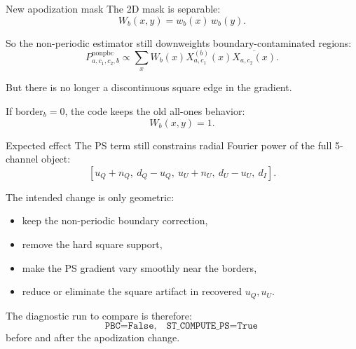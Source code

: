 \documentclass[aspectratio=169,11pt]{beamer}
\begin{document}
\begin{frame}[fragile]{New apodization mask}
The 2D mask is separable:
\[
  W_b(x,y)=w_b(x)\,w_b(y).
\]

\vspace{0.25em}
So the non-periodic estimator still downweights boundary-contaminated regions:
\[
  P^{\mathrm{nonpbc}}_{a,c_1,c_2,b}
  \propto
  \sum_x
  W_b(x)
  X^{(b)}_{a,c_1}(x)
  \overline{X_{a,c_2}(x)}.
\]

\vspace{0.25em}
But there is no longer a discontinuous square edge in the gradient.

\vspace{0.25em}
If $\mathrm{border}_b=0$, the code keeps the old all-ones behavior:
\[
  W_b(x,y)=1.
\]
\end{frame}

\begin{frame}[fragile]{Expected effect}
The PS term still constrains radial Fourier power of the full 5-channel object:
\[
  [u_Q+n_Q,\ d_Q-u_Q,\ u_U+n_U,\ d_U-u_U,\ d_I].
\]

\vspace{0.25em}
The intended change is only geometric:
\begin{itemize}
  \item keep the non-periodic boundary correction,
  \item remove the hard square support,
  \item make the PS gradient vary smoothly near the borders,
  \item reduce or eliminate the square artifact in recovered $u_Q,u_U$.
\end{itemize}

\vspace{0.25em}
The diagnostic run to compare is therefore:
\[
  \texttt{PBC=False},\quad \texttt{ST\_COMPUTE\_PS=True}
\]
before and after the apodization change.
\end{frame}
\end{document}
